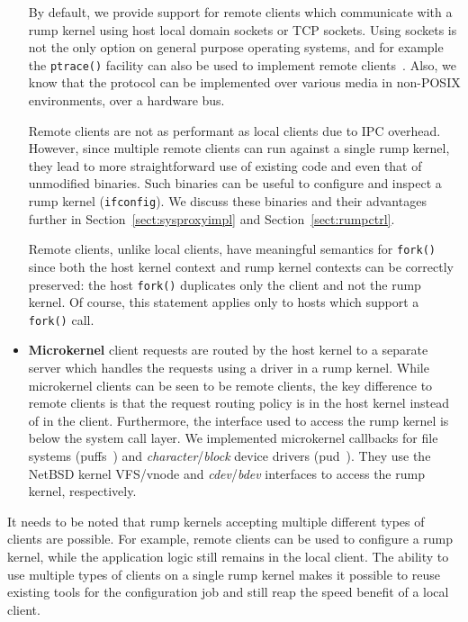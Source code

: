 \begin{itemize}
	By default, we provide support for remote clients which
	communicate with a rump kernel using host local domain sockets or TCP
	sockets.  Using sockets is not the only option on
	general purpose operating systems, and for example the
	\texttt{ptrace()} facility can also be used to implement remote
	clients~\cite{dike:uml,gardenghi:viewos}.  Also, we know that
	the protocol can be implemented over various media in non-POSIX
	environments, \eg over a hardware bus.

	Remote clients are not as performant as local clients due to
	IPC overhead.
	However, since multiple remote clients can run against a
	single rump kernel, they lead to more straightforward use
	of existing code and even that of unmodified binaries.
	Such binaries can be useful to configure and inspect a
	rump kernel (\eg \texttt{ifconfig}).  We discuss these binaries
	and their advantages further in Section~\ref{sect:sysproxyimpl}
	and Section~\ref{sect:rumpctrl}.

	Remote clients, unlike local clients, have meaningful semantics
	for \texttt{fork()} since both the host kernel context and
	rump kernel contexts can be correctly preserved: the host
	\texttt{fork()} duplicates only the client and not the rump
	kernel.  Of course, this statement applies only to hosts
	which support a \verb+fork()+ call.

\item   \textbf{Microkernel} client requests are routed by the host kernel to
	a separate server which handles the requests using a driver in a
	rump kernel.  While microkernel clients can be seen to be remote
	clients, the key difference to remote clients is that the request
	routing policy is in the host kernel instead of in the client.
	Furthermore, the interface used to access the rump kernel
	is below the system call layer.  We implemented microkernel
	callbacks for file systems (puffs~\cite{kantee:puffs})
	and \textit{character}/\textit{block} device drivers
	(pud~\cite{man4:pud}).	They use the NetBSD kernel VFS/vnode
	and \textit{cdev}/\textit{bdev} interfaces to access the rump
	kernel, respectively.
\end{itemize}

It needs to be noted that rump kernels accepting multiple different types
of clients are possible.  For example, remote clients can be used to
configure a rump kernel, while the application logic still remains in
the local client.  The ability to use multiple types of clients on a
single rump kernel makes it possible to reuse existing tools for
the configuration job and still reap the speed benefit of a local client.

